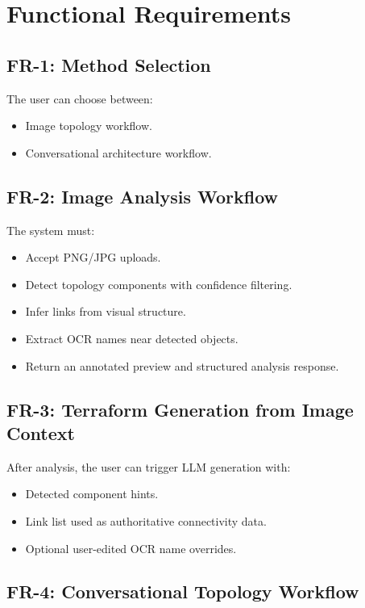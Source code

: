 \documentclass[12pt,a4paper,openany]{report}
\begin{document}
\section{Functional Requirements}

\subsection{FR-1: Method Selection}

The user can choose between:
\begin{itemize}
    \item Image topology workflow.
    \item Conversational architecture workflow.
\end{itemize}

\subsection{FR-2: Image Analysis Workflow}

The system must:
\begin{itemize}
    \item Accept PNG/JPG uploads.
    \item Detect topology components with confidence filtering.
    \item Infer links from visual structure.
    \item Extract OCR names near detected objects.
    \item Return an annotated preview and structured analysis response.
\end{itemize}

\subsection{FR-3: Terraform Generation from Image Context}

After analysis, the user can trigger LLM generation with:
\begin{itemize}
    \item Detected component hints.
    \item Link list used as authoritative connectivity data.
    \item Optional user-edited OCR name overrides.
\end{itemize}

\subsection{FR-4: Conversational Topology Workflow}
\end{document}
